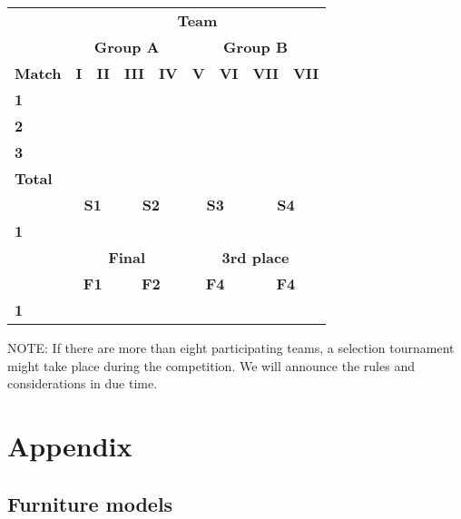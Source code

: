 \documentclass{article}
\begin{document}
\begin{table}[h!]
\begin{center}
\begin{tabular}{ |m{1.5cm}|m{0.6cm}|m{0.6cm}|m{0.6cm}|m{0.6cm}|m{0.6cm}|m{0.6cm}|m{0.6cm}|m{0.6cm}| } 
    \hline
    &\multicolumn{8}{|c|}{\textbf{Team}}\\
    \cline{2-9}
    &\multicolumn{4}{|c|}{\textbf{Group A}} & \multicolumn{4}{|c|}{\textbf{Group B}}\\
	\cline{2-9}
    \textbf{Match} & \textbf{I} & \textbf{II} & \textbf{III} & \textbf{IV} & \textbf{V} & \textbf{VI} & \textbf{VII} & \textbf{VII} \\ 
    \hline
    \textbf{1} & & & & & & & & \\
    \hline
    \textbf{2} & & & & & & & & \\
    \hline
    \textbf{3} & & & & & & & & \\
    \hline
    \textbf{Total} & & & & & & & & \\
    \hline
    \hline
    & \multicolumn{2}{|c|}{\textbf{S1}} & \multicolumn{2}{|c|}{\textbf{S2}} & \multicolumn{2}{|c|}{\textbf{S3}} & \multicolumn{2}{|c|}{\textbf{S4}} \\
    \hline
    \textbf{1} & \multicolumn{2}{|c|}{} & \multicolumn{2}{|c|}{} & \multicolumn{2}{|c|}{} & \multicolumn{2}{|c|}{} \\
    \hline
    \hline
    & \multicolumn{4}{|c|}{\textbf{Final}} & \multicolumn{4}{|c|}{\textbf{3rd place}} \\
    \hline
    & \multicolumn{2}{|c|}{\textbf{F1}} & \multicolumn{2}{|c|}{\textbf{F2}} & \multicolumn{2}{|c|}{\textbf{F4}} & \multicolumn{2}{|c|}{\textbf{F4}} \\
    \hline
    \textbf{1} & \multicolumn{2}{|c|}{} & \multicolumn{2}{|c|}{} & \multicolumn{2}{|c|}{} & \multicolumn{2}{|c|}{} \\
    \hline
\end{tabular}
\end{center}
\label{table:fixtures}
\end{table}

NOTE: If there are more than eight participating teams, a selection tournament might take place during the competition. We will announce the rules and considerations in due time. 

\newpage
\section{Appendix}
\subsection{Furniture models} \label{sec:furniture}
\end{document}
